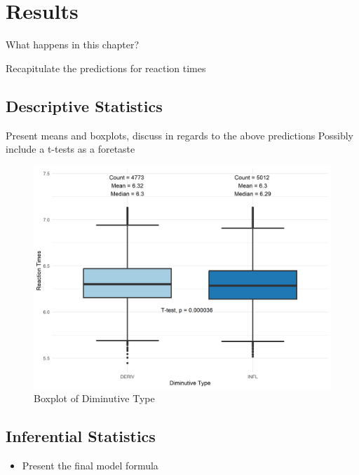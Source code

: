 \chapter{Results}\label{chp:results}

What happens in this chapter?

Recapitulate the predictions for reaction times
\section{Descriptive Statistics} \label{sec:desc_stats}

Present means and boxplots, discuss in regards to the above predictions
Possibly include a t-tests as a foretaste
\begin{figure}[h]
    \centering
    \includegraphics[width=\textwidth]{images/dim_box.png}
    \caption{Boxplot of Diminutive Type}
    \label{fig:boxplot}
\end{figure}

\section{Inferential Statistics} \label{sec:inf_stats}
\begin{itemize}
\item Present the final model formula
\end{itemize}

